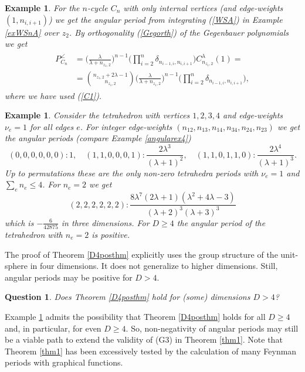 \documentclass[oneside]{amsart}
\theoremstyle{plain}
\newtheorem{quest}[thm]{Question}
\newtheorem{ex}[thm]{Example}
\begin{document}
\begin{ex}\label{exWSnAper}
For the $n$-cycle $C_n$ with only internal vertices (and edge-weights $(1,n_{i,i+1})$) we get the angular period from integrating (\ref{WSA}) in Example \ref{exWSnA} over $z_2$.
By orthogonality (\ref{Gegorth}) of the Gegenbauer polynomials we get
\begin{align}
\begin{aligned}
\label{exWSnApereq}
P_{C_n}^\angle&=\Big(\frac{\lambda}{\lambda+n_{z_1,2}}\Big)^{n-1}\!\Big(\prod_{i=2}^n\delta_{n_{i-1,i},n_{i,i+1}}\Big)C^\lambda_{n_{z_1,2}}(1)
 =\\
&=\genfrac(){0pt}{}{n_{z_1,2}+2\lambda-1}{n_{z_1,2}}\Big(\frac{\lambda}{\lambda+n_{z_1,2}}\Big)^{n-1}\!\Big(\prod_{i=2}^n\delta_{n_{i-1,i},n_{i,i+1}}\Big),
\end{aligned}
\end{align}
where we have used (\ref{C1}).
\end{ex}

\begin{ex}\label{exneg}
Consider the tetrahedron with vertices $1,2,3,4$ and edge-weights $\nu_e=1$ for all edges $e$.
For integer edge-weights $(n_{12},n_{13},n_{14},n_{34},n_{24},n_{23})$ we get the angular periods (compare Example \ref{angularex4})
$$
(0,0,0,0,0,0):1,\quad(1,1,0,0,0,1):\frac{2\lambda^3}{(\lambda+1)^2},\quad(1,1,0,1,1,0):\frac{2\lambda^4}{(\lambda+1)^3}.
$$
Up to permutations these are the only non-zero tetrahedra periods with $\nu_e=1$ and $\sum_e n_e\leq4$. For $n_e=2$ we get
$$
(2,2,2,2,2,2):\frac{8\lambda^7(2\lambda+1)(\lambda^2+4\lambda-3)}{(\lambda+2)^3(\lambda+3)^3}
$$
which is $-\frac{6}{42875}$ in three dimensions. For $D\geq4$ the angular period of the tetrahedron with $n_e=2$ is positive.
\end{ex}

The proof of Theorem \ref{D4posthm} explicitly uses the group structure of the unit-sphere in four dimensions.
It does not generalize to higher dimensions. Still, angular periods may be positive for $D>4$.
\begin{quest}\label{posquest}
Does Theorem \ref{D4posthm} hold for (some) dimensions $D>4$?
\end{quest}
Example \ref{exneg} admits the possibility that Theorem \ref{D4posthm} holds for all $D\geq4$ and, in particular, for even $D\geq4$. So, non-negativity of angular periods may still be
a viable path to extend the validity of (G3) in Theorem \ref{thm1}. Note that Theorem \ref{thm1} has been excessively tested by the calculation of many Feynman periods with graphical functions.
\end{document}

